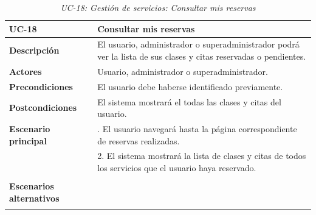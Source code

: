 \begin{table}
  \begin{center}
    \begin{tabularx}{16.4cm}{|l|X|}
      \hline
      \textbf{UC-18} & \textbf{Consultar mis reservas}\\
      \hline
      \textbf{Descripción} & El usuario, administrador o superadministrador podrá ver la lista de sus clases y citas reservadas o pendientes. \\
      \hline
      \textbf{Actores} & Usuario, administrador o superadministrador. \\
      \hline
      \textbf{Precondiciones} & El usuario debe haberse identificado previamente.\\
      \hline
      \textbf{Postcondiciones} & El sistema mostrará el todas las clases y citas del usuario.\\
      \hline
      \textbf{Escenario principal} & \smallskip 1. El usuario navegará hasta la página correspondiente de reservas realizadas.\\
      & 2. El sistema mostrará la lista de clases y citas de todos los servicios que el usuario haya reservado.\\
      & \\
      \hline
      \textbf{Escenarios alternativos} & \\
      & \\
      \hline
    \end{tabularx}
    \caption{\textit{UC-18: Gestión de servicios: Consultar mis reservas}}
    \label{tab:CU-reservas}
  \end{center}
\end{table}


